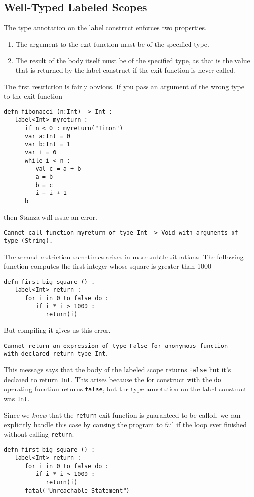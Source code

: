 \documentclass[10pt,oneside]{book}
\begin{document}
\subsection*{Well-Typed Labeled Scopes}

The type annotation on the label construct enforces two properties.
\begin{enumerate}
\item The argument to the exit function must be of the specified type. 
\item The result of the body itself must be of the specified type, as that is the value that is returned by the label construct if the exit function is never called.
\end{enumerate}

The first restriction is fairly obvious. If you pass an argument of the wrong type to the exit function
\begin{lstlisting}
defn fibonacci (n:Int) -> Int :
   label<Int> myreturn :
      if n < 0 : myreturn("Timon")
      var a:Int = 0
      var b:Int = 1
      var i = 0
      while i < n :
         val c = a + b
         a = b
         b = c
         i = i + 1
      b
\end{lstlisting}
then Stanza will issue an error.
\begin{lstlisting}
Cannot call function myreturn of type Int -> Void with arguments of type (String).
\end{lstlisting}

The second restriction sometimes arises in more subtle situations. The following function computes the first integer whose square is greater than 1000.
\begin{lstlisting}
defn first-big-square () :
   label<Int> return :
      for i in 0 to false do :
         if i * i > 1000 :
            return(i)   
\end{lstlisting}
But compiling it gives us this error.
\begin{lstlisting}
Cannot return an expression of type False for anonymous function
with declared return type Int.
\end{lstlisting}
This message says that the body of the labeled scope returns \texttt{\frenchspacing False} but it's declared to return \texttt{\frenchspacing Int}. This arises because the for construct with the \texttt{\frenchspacing do} operating function returns \texttt{\frenchspacing false}, but the type annotation on the label construct was \texttt{\frenchspacing Int}.

Since we {\em know} that the \texttt{\frenchspacing return} exit function is guaranteed to be called, we can explicitly handle this case by causing the program to fail if the loop ever finished without calling \texttt{\frenchspacing return}. 
\begin{lstlisting}
defn first-big-square () :
   label<Int> return :
      for i in 0 to false do :
         if i * i > 1000 :
            return(i)
      fatal("Unreachable Statement")      
\end{lstlisting}
\end{document}
